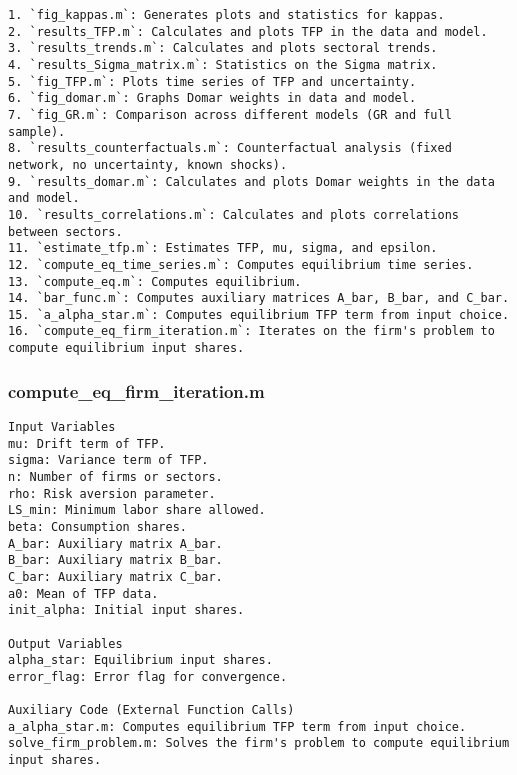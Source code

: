 \documentclass[11pt]{article}
\theoremstyle{definition}
\newcommand{\codepath}{F:/12004835/replication_package_final/replication_package_final}
\begin{document}
\begin{lstlisting}[style=Matlab]
1. `fig_kappas.m`: Generates plots and statistics for kappas.
2. `results_TFP.m`: Calculates and plots TFP in the data and model.
3. `results_trends.m`: Calculates and plots sectoral trends.
4. `results_Sigma_matrix.m`: Statistics on the Sigma matrix.
5. `fig_TFP.m`: Plots time series of TFP and uncertainty.
6. `fig_domar.m`: Graphs Domar weights in data and model.
7. `fig_GR.m`: Comparison across different models (GR and full sample).
8. `results_counterfactuals.m`: Counterfactual analysis (fixed network, no uncertainty, known shocks).
9. `results_domar.m`: Calculates and plots Domar weights in the data and model.
10. `results_correlations.m`: Calculates and plots correlations between sectors.
11. `estimate_tfp.m`: Estimates TFP, mu, sigma, and epsilon.
12. `compute_eq_time_series.m`: Computes equilibrium time series.
13. `compute_eq.m`: Computes equilibrium.
14. `bar_func.m`: Computes auxiliary matrices A_bar, B_bar, and C_bar.
15. `a_alpha_star.m`: Computes equilibrium TFP term from input choice.
16. `compute_eq_firm_iteration.m`: Iterates on the firm's problem to compute equilibrium input shares.
	\end{lstlisting}
	
	
	
	
	
	\subsubsection{compute\_eq\_firm\_iteration.m}
	\begin{lstlisting}[style=Matlab]
Input Variables
mu: Drift term of TFP.
sigma: Variance term of TFP.
n: Number of firms or sectors.
rho: Risk aversion parameter.
LS_min: Minimum labor share allowed.
beta: Consumption shares.
A_bar: Auxiliary matrix A_bar.
B_bar: Auxiliary matrix B_bar.
C_bar: Auxiliary matrix C_bar.
a0: Mean of TFP data.
init_alpha: Initial input shares.

Output Variables
alpha_star: Equilibrium input shares.
error_flag: Error flag for convergence.

Auxiliary Code (External Function Calls)
a_alpha_star.m: Computes equilibrium TFP term from input choice.
solve_firm_problem.m: Solves the firm's problem to compute equilibrium input shares.
	\end{lstlisting}
	
	
	
	
\end{document}
